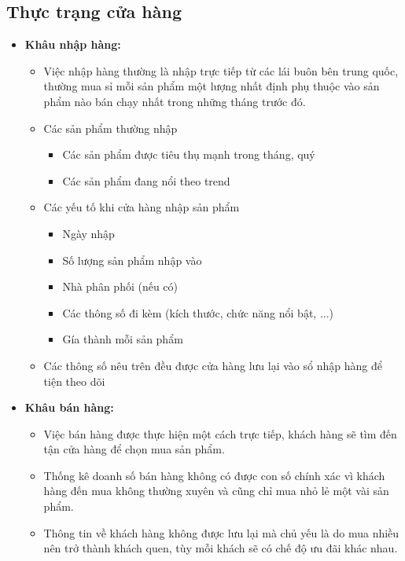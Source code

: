 \subsection{Thực trạng cửa hàng}
\begin{itemize}
	\item\textbf{Khâu nhập hàng:}\par
	      \vspace{-1em}
	      \begin{itemize}
		      \item Việc nhập hàng thường là nhập trực tiếp từ các lái buôn bên trung quốc, thường mua sỉ mỗi sản phẩm một lượng nhất định phụ thuộc vào sản phẩm nào bán chạy nhất trong những tháng trước đó.
		      \item Các sản phẩm thường nhập
		            \begin{itemize}
			            \item Các sản phẩm được tiêu thụ mạnh trong tháng, quý
			            \item Các sản phẩm đang nổi theo trend
		            \end{itemize}
		      \item Các yếu tố khi cửa hàng nhập sản phẩm
		            \begin{itemize}
			            \item Ngày nhập
			            \item Số lượng sản phẩm nhập vào
			            \item Nhà phân phối (nếu có)
			            \item Các thông số đi kèm (kích thước, chức năng nổi bật, ...)
			            \item Gía thành mỗi sản phẩm
		            \end{itemize}
		      \item Các thông số nêu trên đều được cửa hàng lưu lại vào sổ nhập hàng để tiện theo dõi
	      \end{itemize}
	\item\textbf{Khâu bán hàng:}\par
	      \begin{itemize}
		      \item Việc bán hàng được thực hiện một cách trực tiếp, khách hàng sẽ tìm đến tận cửa hàng để chọn mua sản phẩm.
		      \item Thống kê doanh số bán hàng không có được con số chính xác vì khách hàng đến mua không thường xuyên và cũng chỉ mua nhỏ lẻ một vài sản phẩm.
		      \item Thông tin về khách hàng không được lưu lại mà chủ yếu là do mua nhiều nên trở thành khách quen, tùy mỗi khách sẽ có chế độ ưu đãi khác nhau.

\end{itemize}
\end{itemize}
